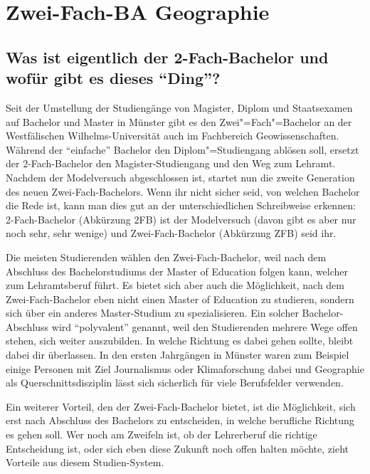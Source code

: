 \chapter{Zwei-Fach-BA Geographie}

\section*{Was ist eigentlich der 2-Fach-Bachelor und wofür gibt es dieses "`Ding"'?}
Seit der Umstellung der Studiengänge von Magister, Diplom und Staatsexamen auf Bachelor und Master in Münster gibt es den Zwei"=Fach"=Bachelor an der Westfälischen Wilhelms-Universität auch im Fachbereich Geowissenschaften. Während der "`einfache"' Bachelor den Diplom"=Studiengang ablösen soll, ersetzt der 2-Fach-Bachelor den Magister-Studiengang und den Weg zum Lehramt. Nachdem der Modelversuch abgeschlossen ist, startet nun die zweite Generation des neuen Zwei-Fach-Bachelors. Wenn ihr nicht sicher seid, von welchen Bachelor die Rede ist, kann man dies gut an der unterschiedlichen Schreibweise erkennen: 2-Fach-Bachelor (Abkürzung 2FB) ist der Modelversuch (davon gibt es aber nur noch sehr, sehr wenige) und Zwei-Fach-Bachelor (Abkürzung ZFB) seid ihr. 

Die meisten Studierenden wählen den Zwei-Fach-Bachelor, weil nach dem Abschluss des Bachelorstudiums der Master of Education folgen kann, welcher zum Lehramtsberuf führt. Es bietet sich aber auch die Möglichkeit, nach dem Zwei-Fach-Bachelor eben nicht einen Master of Education zu studieren, sondern sich über ein anderes Master-Studium zu spezialisieren. Ein solcher Bachelor-Abschluss wird "`polyvalent"' genannt, weil den Studierenden mehrere Wege offen stehen, sich weiter auszubilden. In welche Richtung es dabei gehen sollte, bleibt dabei dir überlassen. In den ersten Jahrgängen in Münster waren zum Beispiel einige Personen mit Ziel Journalismus oder Klimaforschung dabei und Geographie als Querschnittsdisziplin lässt sich sicherlich für viele Berufsfelder verwenden.

Ein weiterer Vorteil, den der Zwei-Fach-Bachelor bietet, ist die Möglichkeit, sich erst nach Abschluss des Bachelors zu entscheiden, in welche berufliche Richtung es gehen soll. Wer noch am Zweifeln ist, ob der Lehrerberuf die richtige Entscheidung ist, oder sich eben diese Zukunft noch offen halten möchte, zieht Vorteile aus diesem Studien-System.

